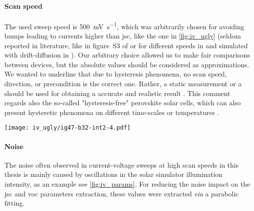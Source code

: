 	\paragraph{Scan speed}\label{characterization_scanspeed}
	The used sweep speed is \SI{500}{\mV\per\s}, which was arbitrarily chosen for avoiding bumps leading to currents higher than \gls{jsc}, like the one in \cref{fig:iv_ugly} (seldom reported in literature, like in figure~S3 of \cite{Du2018} or for different speeds in \cite{CorreaBaena2015,Tress2015,Unger2014,Richardson2016} and simulated with drift-diffusion in \cite{Walter2018}).
	Our arbitrary choice allowed us to make fair comparisons between devices, but the absolute values should be considered as approximations.
	We wanted to underline that due to hysteresis phenomena, no scan speed, direction, or precondition is the correct one.
	Rather, a static measurement or a  should be used for obtaining a accurate and realistic result \cite{Zimmermann2016}.
	This comment regards also the so-called "hysteresis-free" perovskite solar cells, which can also present hysteretic phenomena on different time\hyp{}scales \cite{Jacobs2018,Du2018} or temperatures \cite{Bryant2015}.

	\begin{SCfigure}%
		\centering
		\texttt{[image: iv\_ugly/ig47-b32-int2-4.pdf]}
		\label{fig:iv_ugly}
	\end{SCfigure}

	\paragraph{Noise}
	The noise often observed in current-voltage sweeps at high scan speeds in this thesis is mainly caused by oscillations in the solar simulator illumination intensity, as an example see \cref{fig:iv_params}.
	For reducing the noise impact on the \gls{jsc} and \gls{voc} parameters extraction, these values were extracted \textsl{via} a parabolic fitting.

